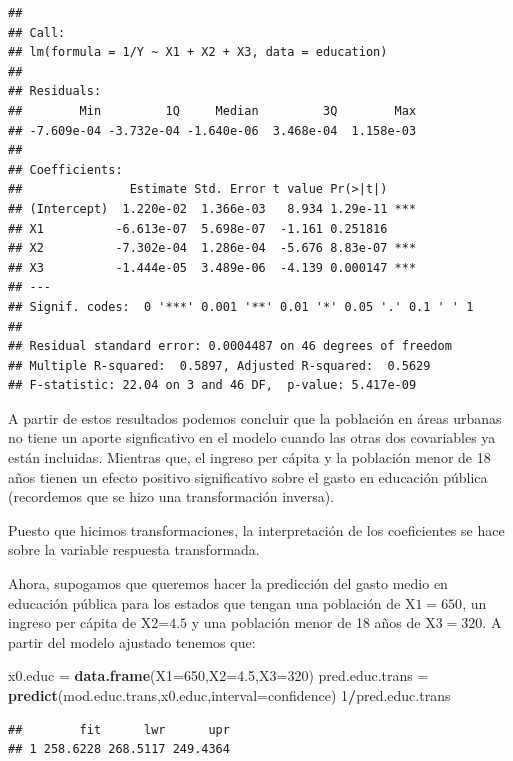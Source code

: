 \documentclass[
]{article}
\newenvironment{Shaded}{\begin{snugshade}}{\end{snugshade}}
\newcommand{\AttributeTok}[1]{\textcolor[rgb]{0.13,0.29,0.53}{#1}}
\newcommand{\DecValTok}[1]{\textcolor[rgb]{0.00,0.00,0.81}{#1}}
\newcommand{\FloatTok}[1]{\textcolor[rgb]{0.00,0.00,0.81}{#1}}
\newcommand{\FunctionTok}[1]{\textcolor[rgb]{0.13,0.29,0.53}{\textbf{#1}}}
\newcommand{\NormalTok}[1]{#1}
\newcommand{\OtherTok}[1]{\textcolor[rgb]{0.56,0.35,0.01}{#1}}
\newcommand{\SpecialCharTok}[1]{\textcolor[rgb]{0.81,0.36,0.00}{\textbf{#1}}}
\newcommand{\StringTok}[1]{\textcolor[rgb]{0.31,0.60,0.02}{#1}}
\begin{document}
\begin{verbatim}
## 
## Call:
## lm(formula = 1/Y ~ X1 + X2 + X3, data = education)
## 
## Residuals:
##        Min         1Q     Median         3Q        Max 
## -7.609e-04 -3.732e-04 -1.640e-06  3.468e-04  1.158e-03 
## 
## Coefficients:
##               Estimate Std. Error t value Pr(>|t|)    
## (Intercept)  1.220e-02  1.366e-03   8.934 1.29e-11 ***
## X1          -6.613e-07  5.698e-07  -1.161 0.251816    
## X2          -7.302e-04  1.286e-04  -5.676 8.83e-07 ***
## X3          -1.444e-05  3.489e-06  -4.139 0.000147 ***
## ---
## Signif. codes:  0 '***' 0.001 '**' 0.01 '*' 0.05 '.' 0.1 ' ' 1
## 
## Residual standard error: 0.0004487 on 46 degrees of freedom
## Multiple R-squared:  0.5897, Adjusted R-squared:  0.5629 
## F-statistic: 22.04 on 3 and 46 DF,  p-value: 5.417e-09
\end{verbatim}

A partir de estos resultados podemos concluir que la población en áreas urbanas no tiene un aporte signficativo en el modelo cuando las otras dos covariables ya están incluidas. Mientras que, el ingreso per cápita y la población menor de 18 años tienen un efecto positivo significativo sobre el gasto en educación pública (recordemos que se hizo una transformación inversa).

Puesto que hicimos transformaciones, la interpretación de los coeficientes se hace sobre la variable respuesta transformada.

Ahora, supogamos que queremos hacer la predicción del gasto medio en educación pública para los estados que tengan una población de \(\mbox{X1}=650\), un ingreso per cápita de \(\mbox{X2=4.5}\) y una población menor de 18 años de \(\mbox{X3}=320\). A partir del modelo ajustado tenemos que:

\begin{Shaded}
\begin{Highlighting}[]
\NormalTok{x0.educ }\OtherTok{=} \FunctionTok{data.frame}\NormalTok{(}\AttributeTok{X1=}\DecValTok{650}\NormalTok{,}\AttributeTok{X2=}\FloatTok{4.5}\NormalTok{,}\AttributeTok{X3=}\DecValTok{320}\NormalTok{)}
\NormalTok{pred.educ.trans }\OtherTok{=} \FunctionTok{predict}\NormalTok{(mod.educ.trans,x0.educ,}\AttributeTok{interval=}\StringTok{\textquotesingle{}confidence\textquotesingle{}}\NormalTok{) }
\DecValTok{1}\SpecialCharTok{/}\NormalTok{pred.educ.trans}
\end{Highlighting}
\end{Shaded}

\begin{verbatim}
##        fit      lwr      upr
## 1 258.6228 268.5117 249.4364
\end{verbatim}
\end{document}
